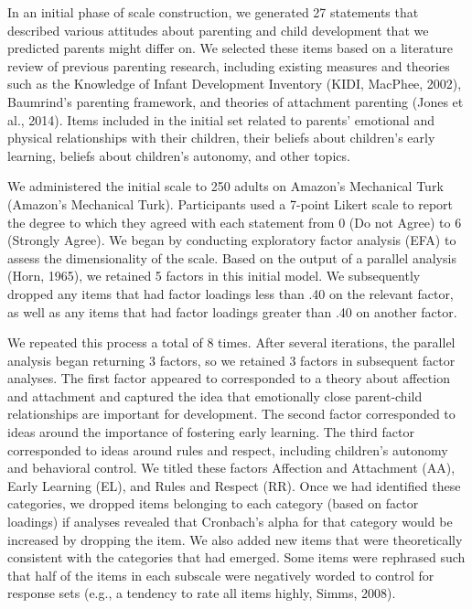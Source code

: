 \documentclass[floatsintext,man]{apa6}
\theoremstyle{definition}
\theoremstyle{definition}
\theoremstyle{definition}
\theoremstyle{remark}
\begin{document}
In an initial phase of scale construction, we generated 27 statements
that described various attitudes about parenting and child development
that we predicted parents might differ on. We selected these items based
on a literature review of previous parenting research, including
existing measures and theories such as the Knowledge of Infant
Development Inventory (KIDI, MacPhee, 2002), Baumrind's parenting
framework, and theories of attachment parenting (Jones et al., 2014).
Items included in the initial set related to parents' emotional and
physical relationships with their children, their beliefs about
children's early learning, beliefs about children's autonomy, and other
topics.

We administered the initial scale to 250 adults on Amazon's Mechanical
Turk (Amazon's Mechanical Turk). Participants used a 7-point Likert
scale to report the degree to which they agreed with each statement from
0 (Do not Agree) to 6 (Strongly Agree). We began by conducting
exploratory factor analysis (EFA) to assess the dimensionality of the
scale. Based on the output of a parallel analysis (Horn, 1965), we
retained 5 factors in this initial model. We subsequently dropped any
items that had factor loadings less than .40 on the relevant factor, as
well as any items that had factor loadings greater than .40 on another
factor.

We repeated this process a total of 8 times. After several iterations,
the parallel analysis began returning 3 factors, so we retained 3
factors in subsequent factor analyses. The first factor appeared to
corresponded to a theory about affection and attachment and captured the
idea that emotionally close parent-child relationships are important for
development. The second factor corresponded to ideas around the
importance of fostering early learning. The third factor corresponded to
ideas around rules and respect, including children's autonomy and
behavioral control. We titled these factors Affection and Attachment
(AA), Early Learning (EL), and Rules and Respect (RR). Once we had
identified these categories, we dropped items belonging to each category
(based on factor loadings) if analyses revealed that Cronbach's alpha
for that category would be increased by dropping the item. We also added
new items that were theoretically consistent with the categories that
had emerged. Some items were rephrased such that half of the items in
each subscale were negatively worded to control for response sets (e.g.,
a tendency to rate all items highly, Simms, 2008).
\end{document}
